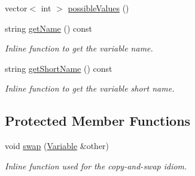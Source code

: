 \begin{DoxyCompactItemize}
vector$<$ int $>$ \hyperlink{classghost_1_1Variable_aef68abc32c9402ed77913dce9412f621}{possible\+Values} ()
\item 
string \hyperlink{classghost_1_1Variable_a89050a5f0798151d4b0a369339be9287}{get\+Name} () const 
\begin{DoxyCompactList}\small\item\em Inline function to get the variable name. \end{DoxyCompactList}\item 
string \hyperlink{classghost_1_1Variable_add76ede3e7bc07d0a6949a500768578b}{get\+Short\+Name} () const 
\begin{DoxyCompactList}\small\item\em Inline function to get the variable short name. \end{DoxyCompactList}\end{DoxyCompactItemize}
\subsection*{Protected Member Functions}
\begin{DoxyCompactItemize}
\item 
void \hyperlink{classghost_1_1Variable_a01b3dfd2e865fed19b5edf0ced7d74bc}{swap} (\hyperlink{classghost_1_1Variable}{Variable} \&other)
\begin{DoxyCompactList}\small\item\em Inline function used for the copy-\/and-\/swap idiom. \end{DoxyCompactList}\end{DoxyCompactItemize}
